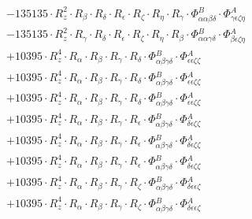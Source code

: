 \documentclass{article}
\begin{document}
\begin{subequations}
\begin{gather}
\begin{array}{c}
 \\[0.2em] 		 - 135135 \cdot R_{z}^{2} \cdot R_{\beta{}} \cdot R_{\delta{}} \cdot R_{\epsilon{}} \cdot R_{\zeta{}} \cdot R_{\eta{}} \cdot R_{\gamma{}} \cdot \Phi{}^{B}_{\alpha{}\alpha{}\beta{}\delta{}} \cdot \Phi{}^{A}_{\gamma{}\epsilon{}\zeta{}\eta{}} 
 \\[0.2em] 		 - 135135 \cdot R_{z}^{2} \cdot R_{\gamma{}} \cdot R_{\delta{}} \cdot R_{\epsilon{}} \cdot R_{\zeta{}} \cdot R_{\eta{}} \cdot R_{\beta{}} \cdot \Phi{}^{B}_{\alpha{}\alpha{}\gamma{}\delta{}} \cdot \Phi{}^{A}_{\beta{}\epsilon{}\zeta{}\eta{}} 
 \\[0.2em] 		 + 10395 \cdot R_{z}^{4} \cdot R_{\alpha{}} \cdot R_{\beta{}} \cdot R_{\gamma{}} \cdot R_{\delta{}} \cdot \Phi{}^{B}_{\alpha{}\beta{}\gamma{}\delta{}} \cdot \Phi{}^{A}_{\epsilon{}\epsilon{}\zeta{}\zeta{}} 
 \\[0.2em] 		 + 10395 \cdot R_{z}^{4} \cdot R_{\alpha{}} \cdot R_{\beta{}} \cdot R_{\gamma{}} \cdot R_{\delta{}} \cdot \Phi{}^{B}_{\alpha{}\beta{}\gamma{}\delta{}} \cdot \Phi{}^{A}_{\epsilon{}\epsilon{}\zeta{}\zeta{}} 
 \\[0.2em] 		 + 10395 \cdot R_{z}^{4} \cdot R_{\alpha{}} \cdot R_{\beta{}} \cdot R_{\gamma{}} \cdot R_{\delta{}} \cdot \Phi{}^{B}_{\alpha{}\beta{}\gamma{}\delta{}} \cdot \Phi{}^{A}_{\epsilon{}\epsilon{}\zeta{}\zeta{}} 
 \\[0.2em] 		 + 10395 \cdot R_{z}^{4} \cdot R_{\alpha{}} \cdot R_{\beta{}} \cdot R_{\gamma{}} \cdot R_{\epsilon{}} \cdot \Phi{}^{B}_{\alpha{}\beta{}\gamma{}\delta{}} \cdot \Phi{}^{A}_{\delta{}\epsilon{}\zeta{}\zeta{}} 
 \\[0.2em] 		 + 10395 \cdot R_{z}^{4} \cdot R_{\alpha{}} \cdot R_{\beta{}} \cdot R_{\gamma{}} \cdot R_{\epsilon{}} \cdot \Phi{}^{B}_{\alpha{}\beta{}\gamma{}\delta{}} \cdot \Phi{}^{A}_{\delta{}\epsilon{}\zeta{}\zeta{}} 
 \\[0.2em] 		 + 10395 \cdot R_{z}^{4} \cdot R_{\alpha{}} \cdot R_{\beta{}} \cdot R_{\gamma{}} \cdot R_{\epsilon{}} \cdot \Phi{}^{B}_{\alpha{}\beta{}\gamma{}\delta{}} \cdot \Phi{}^{A}_{\delta{}\epsilon{}\zeta{}\zeta{}} 
 \\[0.2em] 		 + 10395 \cdot R_{z}^{4} \cdot R_{\alpha{}} \cdot R_{\beta{}} \cdot R_{\gamma{}} \cdot R_{\zeta{}} \cdot \Phi{}^{B}_{\alpha{}\beta{}\gamma{}\delta{}} \cdot \Phi{}^{A}_{\delta{}\epsilon{}\epsilon{}\zeta{}} 
 \\[0.2em] 		 + 10395 \cdot R_{z}^{4} \cdot R_{\alpha{}} \cdot R_{\beta{}} \cdot R_{\gamma{}} \cdot R_{\zeta{}} \cdot \Phi{}^{B}_{\alpha{}\beta{}\gamma{}\delta{}} \cdot \Phi{}^{A}_{\delta{}\epsilon{}\epsilon{}\zeta{}} 

\end{array}
\end{gather}
\end{subequations}
\end{document}
